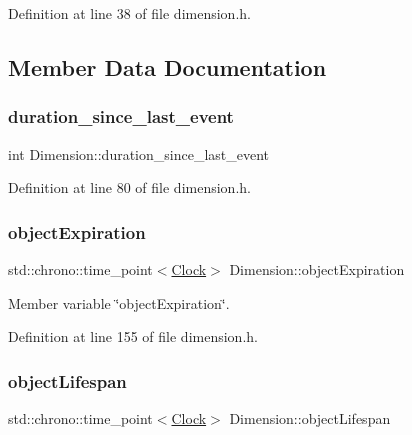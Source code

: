 Definition at line 38 of file dimension.\+h.



\subsection{Member Data Documentation}
\mbox{\label{class_dimension_a8095020214e474081002dbf7d9ff9d42}} 
\subsubsection{\texorpdfstring{duration\+\_\+since\+\_\+last\+\_\+event}{duration\_since\_last\_event}}
{\footnotesize\ttfamily int Dimension\+::duration\+\_\+since\+\_\+last\+\_\+event}



Definition at line 80 of file dimension.\+h.

\mbox{\label{class_dimension_ac2df45c101a97359cfe179636f62b0f2}} 
\subsubsection{\texorpdfstring{object\+Expiration}{objectExpiration}}
{\footnotesize\ttfamily std\+::chrono\+::time\+\_\+point$<$\mbox{\hyperlink{universe_8h_a0ef8d951d1ca5ab3cfaf7ab4c7a6fd80}{Clock}}$>$ Dimension\+::object\+Expiration\hspace{0.3cm}{\ttfamily [protected]}}



Member variable \char`\"{}object\+Expiration\char`\"{}. 



Definition at line 155 of file dimension.\+h.

\mbox{\label{class_dimension_a249074ae65a06cb5386baf196bdee022}} 
\subsubsection{\texorpdfstring{object\+Lifespan}{objectLifespan}}
{\footnotesize\ttfamily std\+::chrono\+::time\+\_\+point$<$\mbox{\hyperlink{universe_8h_a0ef8d951d1ca5ab3cfaf7ab4c7a6fd80}{Clock}}$>$ Dimension\+::object\+Lifespan\hspace{0.3cm}{\ttfamily [protected]}}



